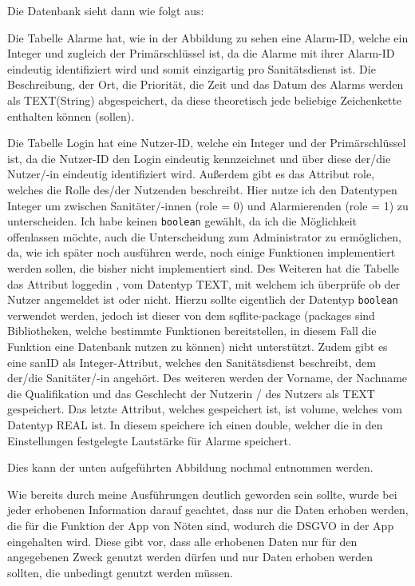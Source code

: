 
    \vspace{5mm}
    Die Datenbank sieht dann wie folgt aus: 

    \vspace{5mm}
    Die Tabelle \glqq Alarme\grqq{} hat, wie in der Abbildung zu sehen eine Alarm-ID, welche ein Integer und 
    zugleich der Primärschlüssel ist, da die Alarme mit ihrer Alarm-ID eindeutig identifiziert 
    wird und somit einzigartig pro Sanitätsdienst ist. Die Beschreibung, der Ort, die Priorität, 
    die Zeit und das Datum des Alarms werden als TEXT(String) abgespeichert, da diese theoretisch 
    jede beliebige Zeichenkette enthalten können (sollen).

    Die Tabelle \glqq Login\grqq{} hat eine Nutzer-ID, welche ein Integer und der Primärschlüssel ist, da die 
    Nutzer-ID den Login eindeutig kennzeichnet und über diese der/die Nutzer/-in eindeutig 
    identifiziert wird. Außerdem gibt es das Attribut role, welches die Rolle des/der Nutzenden 
    beschreibt. Hier nutze ich den Datentypen Integer um zwischen Sanitäter/-innen (role = 0) und 
    Alarmierenden (role = 1) zu unterscheiden. Ich habe keinen \texttt{boolean} gewählt, da ich die 
    Möglichkeit offenlassen möchte, auch die Unterscheidung zum Administrator zu ermöglichen, da, 
    wie ich später noch ausführen werde, noch einige Funktionen implementiert werden sollen, die 
    bisher nicht implementiert sind. Des Weiteren hat die Tabelle das Attribut \glqq loggedin
    \grqq{}, vom Datentyp TEXT, mit welchem ich überprüfe ob der Nutzer angemeldet ist oder 
    nicht. Hierzu sollte eigentlich der Datentyp \texttt{boolean} verwendet werden, jedoch ist dieser von 
    dem sqflite-package (packages sind Bibliotheken, welche bestimmte Funktionen bereitstellen, in diesem Fall 
    die Funktion eine Datenbank nutzen zu können) nicht unterstützt\cite{sqlite-Datatypes}. Zudem gibt es eine sanID als 
    Integer-Attribut, welches den Sanitätsdienst beschreibt, dem der/die Sanitäter/-in angehört.
    Des weiteren werden der Vorname, der Nachname die Qualifikation und das Geschlecht der 
    Nutzerin / des Nutzers als TEXT gespeichert. Das letzte Attribut, welches gespeichert ist, 
    ist volume, welches vom Datentyp REAL ist. In diesem speichere ich einen double, welcher die 
    in den Einstellungen festgelegte Lautstärke für Alarme speichert.

    Dies kann der unten aufgeführten Abbildung nochmal entnommen werden.

    Wie bereits durch meine Ausführungen deutlich geworden sein sollte, wurde bei jeder 
    erhobenen Information darauf geachtet, dass nur die Daten erhoben werden, die für die 
    Funktion der App von Nöten sind, wodurch die DSGVO in der App eingehalten wird.
    Diese gibt vor, dass alle erhobenen Daten nur für den angegebenen Zweck genutzt werden dürfen 
    und nur Daten erhoben werden sollten, die unbedingt genutzt werden müssen\cite{DSGVO}.